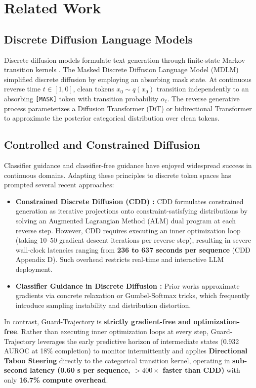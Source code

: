 \documentclass[11pt]{article}
\begin{document}
\section{Related Work}

\subsection{Discrete Diffusion Language Models}
Discrete diffusion models formulate text generation through finite-state Markov transition kernels \cite{sohl2015deep,austin2021structured}. The Masked Discrete Diffusion Language Model (MDLM) \cite{sahoo2024simple} simplified discrete diffusion by employing an absorbing mask state. At continuous reverse time $t \in [1, 0]$, clean tokens $x_0 \sim q(x_0)$ transition independently to an absorbing \texttt{[MASK]} token with transition probability $\alpha_t$. The reverse generative process parameterizes a Diffusion Transformer (DiT) or bidirectional Transformer to approximate the posterior categorical distribution over clean tokens.

\subsection{Controlled and Constrained Diffusion}
Classifier guidance \cite{dhariwal2021diffusion} and classifier-free guidance \cite{ho2022classifier} have enjoyed widespread success in continuous domains. Adapting these principles to discrete token spaces has prompted several recent approaches:
\begin{itemize}
    \item \textbf{Constrained Discrete Diffusion (CDD) \cite{cardei2025cdd}:} CDD formulates constrained generation as iterative projections onto constraint-satisfying distributions by solving an Augmented Lagrangian Method (ALM) dual program at each reverse step. However, CDD requires executing an inner optimization loop (taking 10--50 gradient descent iterations per reverse step), resulting in severe wall-clock latencies ranging from \textbf{236 to 637 seconds per sequence} (CDD Appendix D). Such overhead restricts real-time and interactive LLM deployment.
    \item \textbf{Classifier Guidance in Discrete Diffusion \cite{he2023diffusion,lou2023discrete}:} Prior works approximate gradients via concrete relaxation or Gumbel-Softmax tricks, which frequently introduce sampling instability and distribution distortion.
\end{itemize}
In contrast, Guard-Trajectory is \textbf{strictly gradient-free and optimization-free}. Rather than executing inner optimization loops at every step, Guard-Trajectory leverages the early predictive horizon of intermediate states (0.932 AUROC at 18\% completion) to monitor intermittently and applies \textbf{Directional Taboo Steering} directly to the categorical transition kernel, operating in \textbf{sub-second latency (0.60 s per sequence, $>400\times$ faster than CDD)} with only \textbf{16.7\% compute overhead}.
\end{document}
